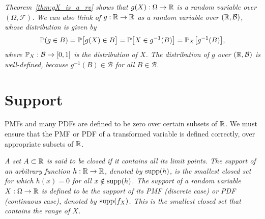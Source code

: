 \begin{remark}\label{rmk:g_as_rv}
\bit
\it 
Theorem~\ref{thm:gX_is_a_rv} shows that $g(X):\Omega\to\mathbb{R}$ is a random variable over $(\Omega,\mathcal{F})$.
\it 
We can also think of $g:\mathbb{R}\to\mathbb{R}$ as a random variable over $(\mathbb{R},\mathcal{B})$, whose distribution is given by
\[
\mathbb{P}(g\in B) 
	= \mathbb{P}\big[g(X)\in B\big] 
	= \mathbb{P}\big[X\in g^{-1}(B)\big] 
	= \mathbb{P}_X\big[g^{-1}(B)\big],
\]
where $\mathbb{P}_X:\mathcal{B}\to[0,1]$ is the distribution of $X$. 
\it
The distribution of $g$ over $(\mathbb{R},\mathcal{B})$ is well-defined, because $g^{-1}(B)\in\mathcal{B}$ for all $B\in\mathcal{B}$.
\eit
\end{remark}


\section{Support}
PMFs and many PDFs are defined to be zero over certain subsets of $\mathbb{R}$. We must ensure that the PMF or PDF of a transformed variable is defined correctly, over appropriate subsets of $\mathbb{R}$.

\begin{definition}
\ben
\it %
A set $A\subset\mathbb{R}$ is said to be \emph{closed} if it contains all its limit points.
\it %
The \emph{support} of an arbitrary function $h:\mathbb{R}\to\mathbb{R}$, denoted by $\text{supp}(h)$, is the smallest closed set for which $h(x)=0$ for all $x\notin\text{supp}(h)$.
\it %
The \emph{support} of a random variable $X:\Omega\to\mathbb{R}$ is defined to be the support of its PMF (discrete case) or PDF (continuous case), denoted by $\text{supp}(f_X)$. This is the smallest closed set that contains the \emph{range} of $X$. 
\een
\end{definition}

